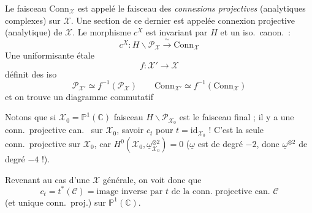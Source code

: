\documentclass[11pt,a4paper]{article}
\begin{document}
Le faisceau $\mathrm{Conn}_{\mathcal{X}}$ est appelé le faisceau des \emph{connexions projectives} (analytiques complexes) sur $\mathcal{X}$. Une section de ce dernier est appelée connexion projective (analytique) de $\mathcal{X}$. \struck{\ill{}} Le morphisme $c^X$ est invariant par $H$ et  un iso.\ canon.\ :
\[
c^X:H\backslash\mathcal{P}_{\mathcal{X}}\xrightarrow{\ \sim\ }\mathrm{Conn}_{\mathcal{X}}
\]
Une uniformisante étale
\[
f:\mathcal{X}'\to\mathcal{X}
\]
définit des iso
\[
\mathcal{P}_{\mathcal{X}'}\simeq f^{-1}(\mathcal{P}_{\mathcal{X}})\qquad\mathrm{Conn}_{\mathcal{X}'}\simeq f^{-1}(\mathrm{Conn}_{\mathcal{X}})
\]
et on trouve un \struck{\ill{}} diagramme commutatif



Notons que si $\mathcal{X}_0=\mathbb{P}^1(\mathbb{C})$  faisceau $H\backslash\mathcal{P}_{\mathcal{X}_0}$ est le faisceau final ;  il y a une conn.\ projective can.\  sur $\mathcal{X}_0$, savoir $c_t$ pour $t=\mathrm{id}_{\mathcal{X}_0}$ ! C'est la seule conn.\ projective sur $\mathcal{X}_0$, car $H^0(\mathcal{X}_0,\underline{\omega}^{\otimes2}_{\mathcal{X}_0})=0$ ($\underline{\omega}$ est de degré $-2$, donc $\underline{\omega}^{\otimes2}$ de degré $-4$ !).

Revenant au cas d'une $\mathcal{X}$ générale, on voit donc que
\[
c_t=t^*(\mathcal{C})=\text{image inverse par }t\text{ de la conn.\ projective can.\ }\mathcal{C}
\]
(et unique conn.\ proj.) sur $\mathbb{P}^1(\mathbb{C})$.
\end{document}
